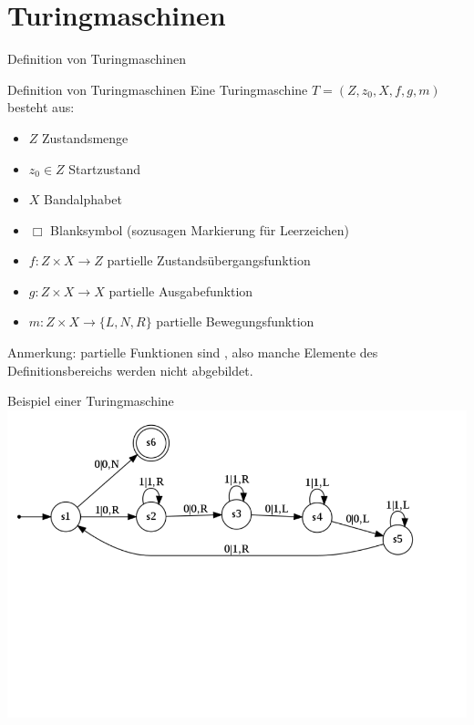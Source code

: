 \documentclass{beamer}
\begin{document}

\begin{frame}
	\titlepage
\end{frame}

\section{Turingmaschinen}


\begin{frame}{Definition von Turingmaschinen}
	\begin{block}{Definition von Turingmaschinen}
		Eine Turingmaschine $T = (Z, z_0, X, f, g, m)$ besteht aus:
		\begin{itemize}
			\item $Z$ Zustandsmenge
			\item $z_0 \in Z$ Startzustand
			\item $X$ Bandalphabet
			\item $\Box$ Blanksymbol (sozusagen Markierung für Leerzeichen)
			\item $f: Z \times X \rightarrow Z$ partielle Zustandsübergangsfunktion
			\item $g: Z \times X \rightarrow X$ partielle Ausgabefunktion
			\item $m: Z \times X \rightarrow \{L, N, R\}$ partielle Bewegungsfunktion
		\end{itemize}
	\end{block}

	Anmerkung: partielle Funktionen sind , also manche Elemente des Definitionsbereichs werden nicht abgebildet.
\end{frame}

\begin{frame}{Beispiel einer Turingmaschine}
	\includegraphics[scale=0.5]{images/turingexample_withoutannotations.png}
\end{frame}
\end{document}
